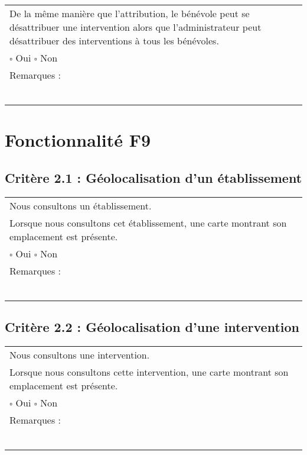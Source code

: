 		\begin{center}
    	 		\begin{tabular}[h]{|p{}|}
			\hline
				De la même manière que l’attribution, le bénévole peut se désattribuer une intervention alors que l’administrateur peut désattribuer des interventions à tous les bénévoles. \\
				
				$\square$ Oui \hfill \hfill $\square$ Non \\\hline Remarques : \\ ~\\
			 \\\hline
     		\end{tabular}
  		\end{center}	
  		
  		
\section{Fonctionnalité F9}
  		
  	\subsection*{Critère 2.1 : Géolocalisation d'un établissement}
  		\begin{center}
    	 		\begin{tabular}[h]{|p{}|}
			\hline
				Nous consultons un établissement. \\
				Lorsque nous consultons cet établissement, une carte montrant son emplacement est présente. \\
						
				$\square$ Oui  \hfill \hfill $\square$ Non \\\hline Remarques : \\ ~\\
			 \\\hline
     		\end{tabular}
  		\end{center}	
  		
  	\subsection*{Critère 2.2 : Géolocalisation d'une intervention}
  		\begin{center}
    	 		\begin{tabular}[h]{|p{}|}
			\hline
				Nous consultons une intervention. \\
				Lorsque nous consultons cette intervention, une carte montrant son emplacement est présente. \\
						
				$\square$ Oui  \hfill \hfill $\square$ Non \\\hline Remarques : \\ ~\\
			 \\\hline
     		\end{tabular}
  		\end{center}	
  		
